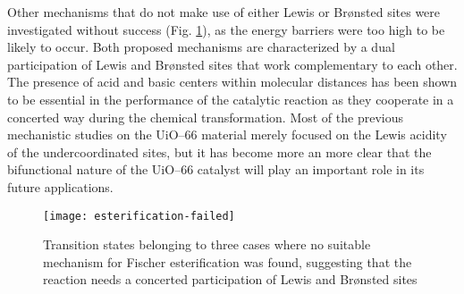\npar
Other mechanisms that do not make use of either Lewis or Br\o{}nsted sites were investigated without success (Fig. \ref{fig:esterification-failed}), as the energy barriers were too high to be likely to occur. Both proposed mechanisms are characterized by a dual participation of Lewis and Br\o{}nsted sites that work complementary to each other. The presence of acid and basic centers within molecular distances has been shown to be essential in the performance of the catalytic reaction as they cooperate in a concerted way during the chemical transformation. Most of the previous mechanistic studies on the UiO--66 material merely focused on the Lewis acidity of the undercoordinated sites, but it has become more an more clear that the bifunctional nature of the UiO--66 catalyst will play an important role in its future applications.
\begin{figure}[!htbp]
	\centering
	\texttt{[image: esterification-failed]}
	\caption{Transition states belonging to three cases where no suitable mechanism for Fischer esterification was found, suggesting that the reaction needs a concerted participation of Lewis and Br\o{}nsted sites}
	\label{fig:esterification-failed}
\end{figure}

